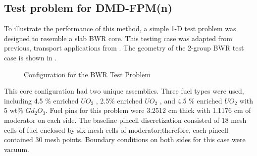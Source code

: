 \subsection{Test problem for DMD-FPM(n)}

To illustrate the performance of this method, a simple 1-D test problem was designed to resemble a slab BWR core.
This testing case was adapted from previous, transport applications from \citet{rahnema_generalized_2008}. 
The geometry of the 2-group BWR test case is shown in .
\begin{figure}[htb!]
    \centering
    \begin{minipage}[c]{\textwidth}
        \centering
        
    \end{minipage}
    \begin{minipage}[c]{\textwidth}
        \centering
        
    \end{minipage}
    \begin{minipage}[c]{\textwidth}
        \centering
        
    \end{minipage}
    \caption{Configuration for the BWR Test Problem}
    \label{fig:BWRconfig}
\end{figure}

This core configuration had two unique assemblies.  
Three fuel types were used, including  4.5 \% enriched $UO_2$ , 2.5\% enriched $UO_2$ , and 4.5 \% enriched $UO_2$ with 5 wt\% $Gd_2O_3$.
Fuel pins for this problem were 3.2512 cm thick with 1.1176 cm of moderator on each side.
The baseline pincell discretization consisted of 18 mesh cells of fuel enclosed by six mesh cells of moderator;therefore, each pincell contained 30 mesh points.
Boundary conditions on both sides for this case were vacuum.

